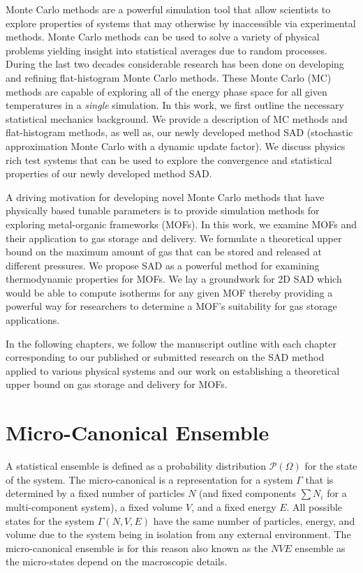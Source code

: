 Monte Carlo methods are a powerful simulation tool that allow scientists to
explore properties of systems that may otherwise by inaccessible via
experimental methods. Monte Carlo methods can be used to solve a variety of
physical problems yielding insight into statistical averages due to random
processes. During the last two decades considerable research has been done on
developing and refining flat-histogram Monte Carlo methods. These Monte Carlo
(MC) methods are capable of exploring all of the energy phase space for all
given temperatures in a \emph{single} simulation. In this work, we first
outline the necessary statistical mechanics background. We provide a
description of MC methods and flat-histogram methods, as well as, our newly
developed method SAD (stochastic approximation Monte Carlo with a dynamic
update factor). We discuss physics rich test systems that can be used to
explore the convergence and statistical properties of our newly developed
method SAD.

A driving motivation for developing novel Monte Carlo methods that have physically based tunable parameters is to provide simulation methods for exploring metal-organic frameworks (MOFs). In this work, we examine MOFs and
their application to gas storage and delivery. We formulate a theoretical upper
bound on the maximum amount of gas that can be stored and released at different
pressures. We propose SAD as a powerful method for examining thermodynamic properties for MOFs.  We lay a groundwork for 2D SAD which would be able to compute isotherms for any given MOF thereby providing a powerful way for researchers to determine a MOF's suitability for gas storage applications.

In the following chapters, we follow the manuscript outline with each chapter corresponding to our published or submitted research on the SAD method applied to various physical systems and our work on establishing a theoretical upper bound on gas storage and delivery for MOFs.

\section{Micro-Canonical Ensemble}\label{micro}
A statistical ensemble is defined as a probability distribution $\mathcal{P}\left(\Omega\right)$ for the state of the system.
The micro-canonical is a representation for a system $\Gamma$ that is determined by a fixed number of particles $N$ (and fixed components $\sum N_i$ for a multi-component system), a fixed volume $V$, and a fixed energy $E$. All possible states for the system $\Gamma\left(N,V,E\right)$ have the same number of particles, energy, and volume due to the system being in isolation from any external environment.
The micro-canonical ensemble is for this reason also known as the $NVE$ ensemble as the micro-states depend on the  macroscopic details.

